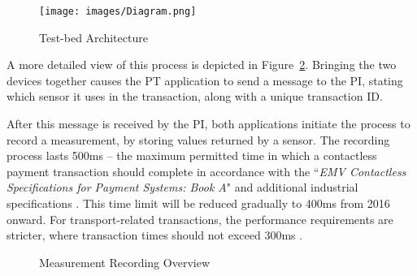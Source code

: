 \documentclass{article}
\begin{document}
\begin{figure}[ht]
	\centering
	\texttt{[image: images/Diagram.png]}
	\caption{Test-bed Architecture}
	\label{fig:Architecture}
\end{figure}

A more detailed view of this process is depicted in Figure~\ref{fig:diagram}.  Bringing the two devices together causes the PT application to send a message to the PI, stating which sensor it uses in the transaction, along with a unique transaction ID\@.

After this message is received by the PI, both applications initiate the process to record a measurement, by storing values returned by a sensor.  The recording process lasts 500ms -- the maximum permitted time in which a contactless payment transaction should complete in accordance with the ``\textit{EMV Contactless Specifications for Payment Systems: Book A}" \cite{EVM2015-ContactlessArchitectureReq} and additional industrial specifications \cite{VISAMobileTicketing2013,MasterCard2014,VISA-TADG}. This time limit will be reduced gradually to 400ms from 2016 onward.  For transport-related transactions, the performance requirements are stricter, where transaction times should not exceed 300ms \cite{transport300,emms2014harvesting}.

\begin{figure}[ht]
	\centering
	\caption{Measurement Recording Overview}
	\label{fig:diagram}
\end{figure} 
\end{document}
